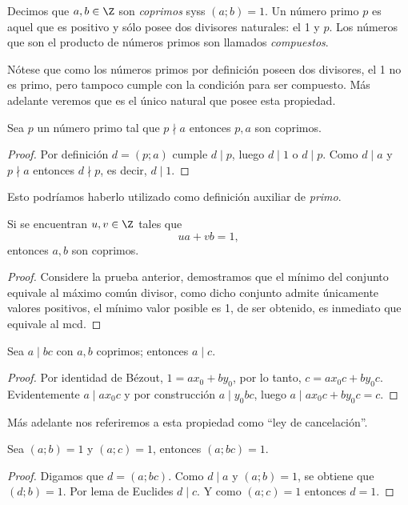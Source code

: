 \documentclass[11pt,oneside]{book}
\begin{document}
\begin{mydef}
Decimos que $a,b\in\Z$ son \textit{coprimos} syss $(a;b)=1$. Un número primo $p$ es aquel que es positivo y sólo posee dos divisores naturales: el 1 y $p$. Los números que son el producto de números primos son llamados \textit{compuestos}.
\end{mydef}
Nótese que como los números primos por definición poseen dos divisores, el 1 no es primo, pero tampoco cumple con la condición para ser compuesto. Más adelante veremos que es el único natural que posee esta propiedad.
\begin{thm}
Sea $p$ un número primo tal que $p\nmid a$ entonces $p,a$ son coprimos.
\end{thm}
\begin{proof}
Por definición $d=(p;a)$ cumple $d\mid p$, luego $d\mid 1$ o $d\mid p$. Como $d\mid a$ y $p\nmid a$ entonces $d\nmid p$, es decir, $d\mid 1$.
\end{proof}
Esto podríamos haberlo utilizado como definición auxiliar de \textit{primo}.
\begin{thm}
Si se encuentran $u,v\in\Z$ tales que
$$ua+vb=1,$$
entonces $a,b$ son coprimos.
\end{thm}
\begin{proof}
Considere la prueba anterior, demostramos que el mínimo del conjunto equivale al máximo común divisor, como dicho conjunto admite únicamente valores positivos, el mínimo valor posible es 1, de ser obtenido, es inmediato que equivale al mcd.
\end{proof}
\begin{thm}
Sea $a\mid bc$ con $a,b$ coprimos; entonces $a\mid c$.
\end{thm}
\begin{proof}
Por identidad de Bézout, $1=ax_0+by_0$, por lo tanto, $c=ax_0c+by_0c$. Evidentemente $a\mid ax_0c$ y por construcción $a\mid y_0bc$, luego $a\mid ax_0c+by_0c=c$.
\end{proof}
Más adelante nos referiremos a esta propiedad como ``ley de cancelación''.
\begin{thm}\label{thm:coprime-transitivity}
Sea $(a;b)=1$ y $(a;c)=1$, entonces $(a;bc)=1$.
\end{thm}
\begin{proof}
Digamos que $d=(a;bc)$. Como $d\mid a$ y $(a;b)=1$, se obtiene que $(d;b)=1$. Por lema de Euclides $d\mid c$. Y como $(a;c)=1$ entonces $d=1$.
\end{proof}
\end{document}
